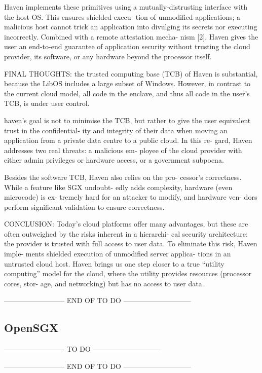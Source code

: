 Haven
implements these primitives using a mutually-distrusting
interface with the host OS. This ensures shielded execu-
tion of unmodified applications; a malicious host cannot
trick an application into divulging its secrets nor executing
incorrectly. Combined with a remote attestation mecha-
nism [2], Haven gives the user an end-to-end guarantee of
application security without trusting the cloud provider,
its software, or any hardware beyond the processor itself.


FINAL THOUGHTS:
the trusted computing base (TCB) of
Haven is substantial, because the LibOS includes a large
subset of Windows. However, in contrast to the current
cloud model, all code in the enclave, and thus all code in
the user’s TCB, is under user control.

haven's goal is not to minimise the TCB, but
rather to give the user equivalent trust in the confidential-
ity and integrity of their data when moving an application
from a private data centre to a public cloud.
In this re-
gard, Haven addresses two real threats: a malicious em-
ployee of the cloud provider with either admin privileges
or hardware access, or a government subpoena.

Besides the software TCB, Haven also relies on the pro-
cessor’s correctness. While a feature like SGX undoubt-
edly adds complexity, hardware (even microcode) is ex-
tremely hard for an attacker to modify, and hardware ven-
dors perform significant validation to ensure correctness.


CONCLUSION:
Today’s cloud platforms offer many advantages, but these
are often outweighed by the risks inherent in a hierarchi-
cal security architecture: the provider is trusted with full
access to user data. To eliminate this risk, Haven imple-
ments shielded execution of unmodified server applica-
tions in an untrusted cloud host. Haven brings us one step
closer to a true “utility computing” model for the cloud,
where the utility provides resources (processor cores, stor-
age, and networking) but has no access to user data.

-------------------------- END OF TO DO -----------------------------

\subsection{OpenSGX}
-------------------------- TO DO -----------------------------



-------------------------- END OF TO DO -----------------------------

